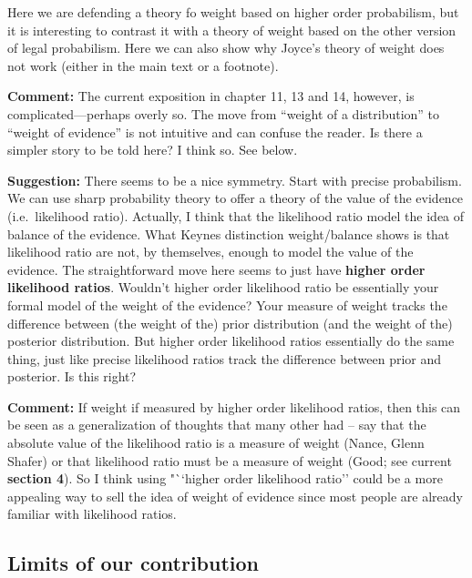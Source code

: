\documentclass[
  10pt,
  dvipsnames,enabledeprecatedfontcommands]{scrartcl}
\begin{document}
Here we are defending a theory fo weight based on higher order
probabilism, but it is interesting to contrast it with a theory of
weight based on the other version of legal probabilism. Here we can also
show why Joyce's theory of weight does not work (either in the main text
or a footnote).

\textbf{Comment:} The current exposition in chapter 11, 13 and 14,
however, is complicated---perhaps overly so. The move from ``weight of a
distribution'' to ``weight of evidence'' is not intuitive and can
confuse the reader. Is there a simpler story to be told here? I think
so. See below.

\textbf{Suggestion:} There seems to be a nice symmetry. Start with
precise probabilism. We can use sharp probability theory to offer a
theory of the value of the evidence (i.e.~likelihood ratio). Actually, I
think that the likelihood ratio model the idea of balance of the
evidence. What Keynes distinction weight/balance shows is that
likelihood ratio are not, by themselves, enough to model the value of
the evidence. The straightforward move here seems to just have
\textbf{higher order likelihood ratios}. Wouldn't higher order
likelihood ratio be essentially your formal model of the weight of the
evidence? Your measure of weight tracks the difference between (the
weight of the) prior distribution (and the weight of the) posterior
distribution. But higher order likelihood ratios essentially do the same
thing, just like precise likelihood ratios track the difference between
prior and posterior. Is this right? 

\textbf{Comment:} If weight if measured by higher order likelihood
ratios, then this can be seen as a generalization of thoughts that many
other had -- say that the absolute value of the likelihood ratio is a
measure of weight (Nance, Glenn Shafer) or that likelihood ratio must be
a measure of weight (Good; see current \textbf{section 4}). So I think
using "``higher order likelihood ratio'' could be a more appealing way
to sell the idea of weight of evidence since most people are already
familiar with likelihood ratios.

\hypertarget{limits-of-our-contribution}{%
\subsection{Limits of our
contribution}\label{limits-of-our-contribution}}
\end{document}
